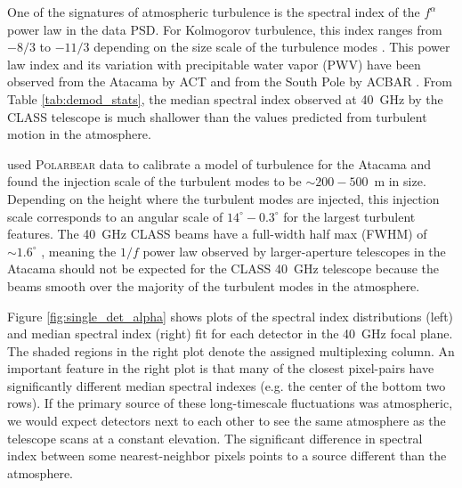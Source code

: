 \documentclass[twocolumn, tighten, numberedappendix, twocolappendix]{aastex63}
\begin{document}
One of the signatures of atmospheric turbulence is the spectral index of the $f^{\alpha}$ power law in the data PSD. For Kolmogorov turbulence, this index ranges from $-8/3$ to $-11/3$ depending on the size scale of the turbulence modes \citep{LayHalverson2000}. This power law index and its variation with precipitable water vapor (PWV) have been observed from the Atacama by ACT \citep{Dunner2013} and from the South Pole by ACBAR \citep{Bussmann2005}. From Table \ref{tab:demod_stats}, the median spectral index observed at 40~GHz by the CLASS telescope is much shallower than the values predicted from turbulent motion in the atmosphere.

\cite{Errard2015} used \textsc{Polarbear} data to calibrate a model of turbulence for the Atacama and found the injection scale of the turbulent modes to be $\sim200-500$~m in size. Depending on the height where the turbulent modes are injected, this injection scale corresponds to an angular scale of $14^\circ - 0.3^\circ$ for the largest turbulent features. The 40~GHz CLASS beams have a full-width half max (FWHM) of $\sim1.6^\circ$ \citep{xu20}, meaning the $1/f$ power law observed by larger-aperture telescopes in the Atacama should not be expected for the CLASS 40~GHz telescope because the beams smooth over the majority of the turbulent modes in the atmosphere. 


Figure \ref{fig:single_det_alpha} shows plots of the spectral index distributions (left) and median spectral index (right) fit for each detector in the 40~GHz focal plane. The shaded regions in the right plot denote the assigned multiplexing column. An important feature in the right plot is that many of the closest pixel-pairs have significantly different median spectral indexes (e.g. the center of the bottom two rows). If the primary source of these long-timescale fluctuations was atmospheric, we would expect detectors next to each other to see the same atmosphere as the telescope scans at a constant elevation. The significant difference in spectral index between some nearest-neighbor pixels points to a source different than the atmosphere. 
\end{document}
